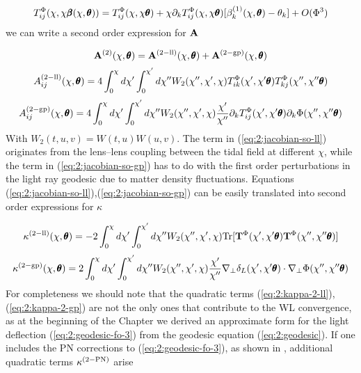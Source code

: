 \begin{equation}
\label{eq:2:tidalapprox}
T^{\Phi}_{ij}(\chi,\chi\pmb{\beta}(\chi,\pmb{\theta})) = T^{\Phi}_{ij}(\chi,\chi\pmb{\theta}) + \chi\partial_kT^{\Phi}_{ij}(\chi,\chi\pmb{\theta})[\beta_k^{(1)}(\chi,\pmb{\theta})-\theta_k] + O(\Phi^3) 
\end{equation}
%
we can write a second order expression for $\mathbf{A}$ 

\begin{equation}
\label{eq:2:jacobian-so}
\mathbf{A}^{(2)}(\chi,\pmb{\theta}) = \mathbf{A}^{(2-{\rm ll})}(\chi,\pmb{\theta}) + \mathbf{A}^{(2-{\rm gp})}(\chi,\pmb{\theta}) 
\end{equation}
%
\begin{equation}
\label{eq:2:jacobian-so-ll}
A_{ij}^{(2-{\rm ll})}(\chi,\pmb{\theta}) = 4\int_0^\chi d\chi'\int_0^{\chi'}d\chi'' W_2(\chi'',\chi',\chi)T^{\Phi}_{ik}(\chi',\chi'\pmb{\theta})T^{\Phi}_{kj}(\chi'',\chi''\pmb{\theta})
\end{equation} 
%
\begin{equation}
\label{eq:2:jacobian-so-gp}
A_{ij}^{(2-{\rm gp})}(\chi,\pmb{\theta}) = 4\int_0^\chi d\chi'\int_0^{\chi'}d\chi'' W_2(\chi'',\chi',\chi)\frac{\chi'}{\chi''}\partial_kT^{\Phi}_{ij}(\chi',\chi'\pmb{\theta})\partial_k\Phi(\chi'',\chi''\pmb{\theta})
\end{equation} 
%
With $W_2(t,u,v)=W(t,u)W(u,v)$. The term in (\ref{eq:2:jacobian-so-ll}) originates from the lens--lens coupling between the tidal field at different $\chi$, while the term in (\ref{eq:2:jacobian-so-gp}) has to do with the first order perturbations in the light ray geodesic due to matter density fluctuations. Equations (\ref{eq:2:jacobian-so-ll}),(\ref{eq:2:jacobian-so-gp}) can be easily translated into second order expressions for $\kappa$

\begin{equation}
\label{eq:2:kappa-2-ll}
\kappa^{(2-{\rm ll})}(\chi,\pmb{\theta}) = -2\int_0^\chi d\chi'\int_0^{\chi'}d\chi'' W_2(\chi'',\chi',\chi){\rm Tr} [\mathbf{T}^{\Phi}(\chi',\chi'\pmb{\theta})\mathbf{T}^{\Phi}(\chi'',\chi''\pmb{\theta})]
\end{equation} 
%
\begin{equation}
\label{eq:2:kappa-2-gp}
\kappa^{(2-{\rm gp})}(\chi,\pmb{\theta}) = 2\int_0^\chi d\chi'\int_0^{\chi'}d\chi'' W_2(\chi'',\chi',\chi)\frac{\chi'}{\chi''}\nabla_\perp \delta_L(\chi',\chi'\pmb{\theta})\cdot\nabla_\perp\Phi(\chi'',\chi''\pmb{\theta})
\end{equation} 
%
For completeness we should note that the quadratic terms (\ref{eq:2:kappa-2-ll}),(\ref{eq:2:kappa-2-gp}) are not the only ones that contribute to the WL convergence, as at the beginning of the Chapter we derived an approximate form for the light deflection (\ref{eq:2:geodesic-fo-3}) from the geodesic equation (\ref{eq:2:geodesic}). If one includes the PN corrections to (\ref{eq:2:geodesic-fo-3}), as shown in \citep{PNLensing}, additional quadratic terms $\kappa^{(2-{\rm PN})}$ arise

